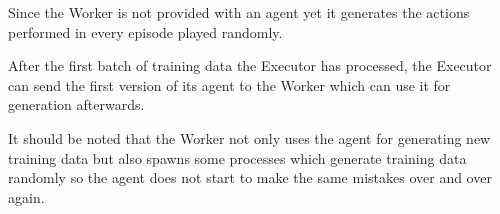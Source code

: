 \begin{itemize}[label={}]
        Since the Worker is not provided with an agent yet
        it generates the actions performed in every episode
        played randomly.

        After the first batch of training data the Executor
        has processed, the Executor can send the first
        version of its agent to the Worker which can use it
        for generation afterwards.

        It should be noted that the Worker not only uses
        the agent for generating new training data but also
        spawns some processes which generate training data
        randomly so the agent does not start to make the
        same mistakes over and over again.

\end{itemize}


